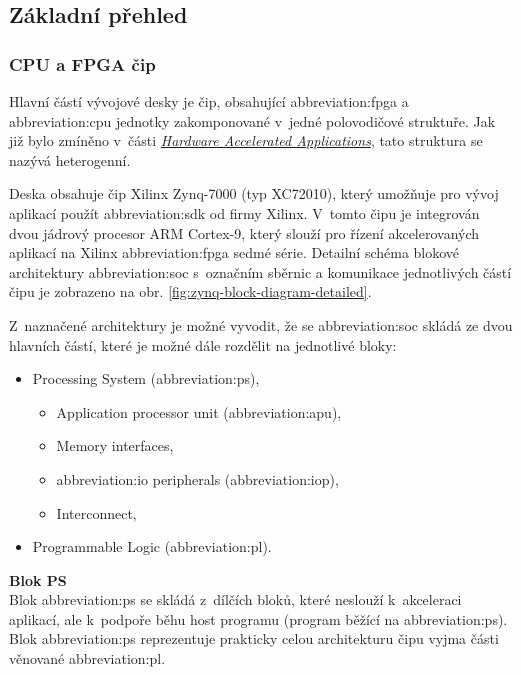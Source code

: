 \documentclass[a4paper, twoside, 11pt]{article}
\begin{document}
		\subsection{Základní přehled}
		\subsubsection{CPU a FPGA čip}
			Hlavní částí vývojové desky je čip, obsahující \gls{abbreviation:fpga} a \gls{abbreviation:cpu} jednotky zakomponované v~jedné polovodičové struktuře. Jak již bylo zmíněno v~části \hyperref[subsec:hardware-accelerated-applications]{\textit{Hardware Accelerated Applications}}, tato struktura se nazývá heterogenní.\par
			Deska obsahuje čip Xilinx Zynq-7000 (typ XC72010), který umožňuje pro vývoj aplikací použít \gls{abbreviation:sdk} od firmy Xilinx. V~tomto čipu je integrován dvou jádrový procesor ARM Cortex-9, který slouží pro řízení akcelerovaných aplikací na Xilinx \gls{abbreviation:fpga} sedmé série. Detailní schéma blokové architektury \gls{abbreviation:soc} s~označním sběrnic a komunikace jednotlivých částí čipu je zobrazeno na obr. \ref{fig:zynq-block-diagram-detailed}.\par
			Z~naznačené architektury je možné vyvodit, že se \gls{abbreviation:soc} skládá ze dvou hlavních částí, které je možné dále rozdělit na jednotlivé bloky:
			\begin{itemize}
				\item Processing System (\gls{abbreviation:ps}),
				\begin{itemize}
					\item Application processor unit (\gls{abbreviation:apu}),
					\item Memory interfaces,
					\item \gls{abbreviation:io} peripherals (\gls{abbreviation:iop}),
					\item Interconnect,
				\end{itemize}
				\item Programmable Logic (\gls{abbreviation:pl}).
			\end{itemize}
			\vspace*{0.25cm}
			\noindent\textbf{Blok PS}\\
			Blok \gls{abbreviation:ps} se skládá z~dílčích bloků, které neslouží k~akceleraci aplikací, ale k~podpoře běhu host programu (program běžící na \gls{abbreviation:ps}). Blok \gls{abbreviation:ps} reprezentuje prakticky celou architekturu čipu vyjma části věnované \gls{abbreviation:pl}.\par\vspace*{0.25cm}
\end{document}
